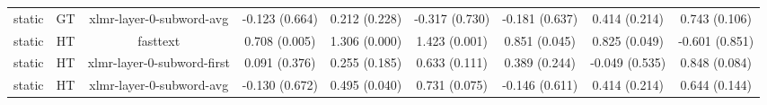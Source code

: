 \begin{sidewaystable}[htb]
\begin{tabular}{@{}ccccccccc@{}}
        static & GT & xlmr-layer-0-subword-avg & -0.123 (0.664) & 0.212 (0.228) & -0.317 (0.730) & -0.181 (0.637) & 0.414 (0.214) & 0.743 (0.106) \\
        static & HT & fasttext & 0.708 (0.005) & 1.306 (0.000) & 1.423 (0.001) & 0.851 (0.045) & 0.825 (0.049) & -0.601 (0.851) \\
        static & HT & xlmr-layer-0-subword-first & 0.091 (0.376) & 0.255 (0.185) & 0.633 (0.111) & 0.389 (0.244) & -0.049 (0.535) & 0.848 (0.084) \\
        static & HT & xlmr-layer-0-subword-avg & -0.130 (0.672) & 0.495 (0.040) & 0.731 (0.075) & -0.146 (0.611) & 0.414 (0.214) & 0.644 (0.144) \\
        \bottomrule
    \end{tabular}
\end{sidewaystable}